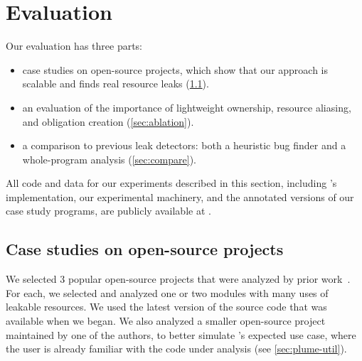 \section{Evaluation}
\label{sec:evaluation}



Our evaluation has three parts:
\begin{itemize}
\item case studies on open-source projects, which show that our approach
  is scalable and finds real resource leaks (\cref{sec:case-studies}).
\item an evaluation of the importance of
  lightweight ownership, %
  resource aliasing, %
  and obligation creation %
  (\cref{sec:ablation}).
\item a comparison to previous leak detectors:  both a heuristic bug finder
  and a whole-program
  analysis (\cref{sec:compare}).
\end{itemize}


All code and data for our experiments described
in this section, including \tool's implementation, our experimental
machinery, and the annotated versions of our case study programs,
are publicly available at .

\subsection{Case studies on open-source projects}
\label{sec:case-studies}

We selected 3 popular open-source projects that were analyzed by prior work~\cite{zuo2019grapple}.
For each, we selected and analyzed one or two modules
with many uses of leakable resources. We used
the latest version of the source code that was available
when we began. We also analyzed a smaller open-source project
maintained by one of the authors, to better simulate \tool's
expected use case, where the user is already familiar with the
code under analysis (see \cref{sec:plume-util}).

